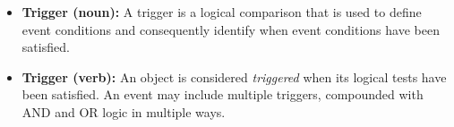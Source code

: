 \documentclass[11pt,fleqn]{report}
\begin{document}
\begin{itemize}
\begin{itemize}
          simulation.
    \item Add or remove subscriptions to/from other models in the
          simulation, potentially affecting their \textit{active} status.
    \item Disable other models elsewhere in the simulation, forcing their
          active status to false regardless of their use by other models.
    \item Execute additional methods to apply additional algorithms. These
          additional algorithms are defined outside the structure of the
          event; the event provides only the interface to them making them
          effectively limitless in capability.
  \end{itemize}
  \item \textbf{Trigger (noun):} A trigger is a logical comparison that is
        used to define event conditions and consequently identify when event
        conditions have been satisfied.
  \item \textbf{Trigger (verb):} An object is considered \textit{triggered}
        when its logical tests have been satisfied. An event may include
        multiple triggers, compounded with AND and OR logic in multiple ways.
\end{itemize}
\end{document}
